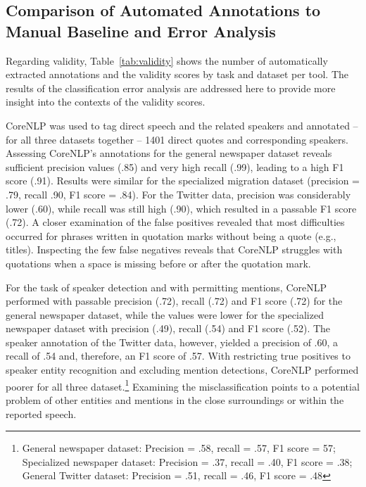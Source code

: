 \documentclass{ccr}
\begin{document}
\subsection{Comparison of Automated Annotations to Manual Baseline and Error
Analysis}

Regarding validity, Table~\ref{tab:validity} shows the number of automatically extracted
annotations and the validity scores by task and dataset per tool. The
results of the classification error analysis are addressed here to
provide more insight into the contexts of the validity scores.

CoreNLP was used to tag direct speech and the related speakers and
annotated -- for all three datasets together -- 1401 direct quotes and
corresponding speakers. Assessing CoreNLP's annotations for the general
newspaper dataset reveals sufficient precision values (.85) and very
high recall (.99), leading to a high F1 score (.91). Results were
similar for the specialized migration dataset (precision = .79, recall
.90, F1 score = .84). For the Twitter data, precision was considerably
lower (.60), while recall was still high (.90), which resulted in a
passable F1 score (.72). A closer examination of the false positives
revealed that most difficulties occurred for phrases written in
quotation marks without being a quote (e.g., titles). Inspecting the few
false negatives reveals that CoreNLP struggles with quotations when a
space is missing before or after the quotation mark.

For the task of speaker detection and with permitting mentions, CoreNLP
performed with passable precision (.72), recall (.72) and F1 score (.72)
for the general newspaper dataset, while the values were lower for the
specialized newspaper dataset with precision (.49), recall (.54) and F1
score (.52). The speaker annotation of the Twitter data, however,
yielded a precision of .60, a recall of .54 and, therefore, an F1 score
of .57. With restricting true positives to speaker entity
recognition and excluding mention detections, CoreNLP performed poorer for all three dataset.\footnote{
General newspaper dataset: Precision = .58, recall = .57, F1 score =
57; Specialized newspaper dataset: Precision = .37, recall = .40, F1 score = .38; General Twitter dataset:
Precision = .51, recall = .46, F1 score = .48} Examining the
misclassification points to a potential problem of other entities and
mentions in the close surroundings or within the reported speech.


\end{document}
